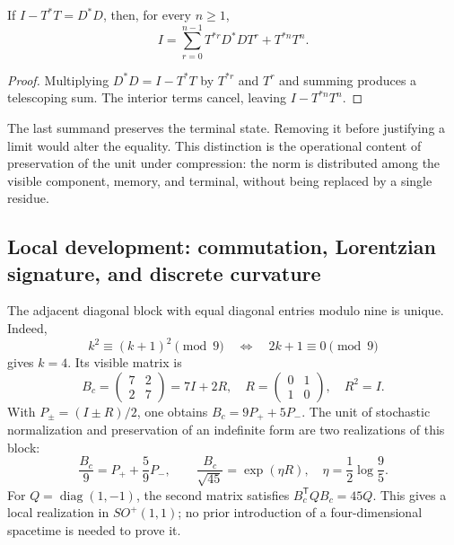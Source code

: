 \begin{proposition}
If \(I-T^*T=D^*D\), then, for every \(n\ge1\),
\begin{equation}
 I=\sum_{r=0}^{n-1}T^{*r}D^*DT^r+T^{*n}T^n.
 \label{eq:telescopia}
\end{equation}
\end{proposition}
\begin{proof}
Multiplying \(D^*D=I-T^*T\) by \(T^{*r}\) and \(T^r\) and summing produces a telescoping sum. The interior terms cancel, leaving \(I-T^{*n}T^n\).
\end{proof}

The last summand preserves the terminal state. Removing it before justifying a limit would alter the equality. This distinction is the operational content of preservation of the unit under compression: the norm is distributed among the visible component, memory, and terminal, without being replaced by a single residue.

\subsection{Local development: commutation, Lorentzian signature, and discrete curvature}
\label{iv:extension-curvatura-mixta}

The adjacent diagonal block with equal diagonal entries modulo nine is unique. Indeed,
\[
 k^2\equiv(k+1)^2\pmod9\quad\Longleftrightarrow\quad2k+1\equiv0\pmod9
\]
gives \(k=4\). Its visible matrix is
\[
 B_c=\begin{pmatrix}7&2\\2&7\end{pmatrix}=7I+2R,
 \quad R=\begin{pmatrix}0&1\\1&0\end{pmatrix},\quad R^2=I.
\]
With \(P_\pm=(I\pm R)/2\), one obtains \(B_c=9P_++5P_-\). The unit of stochastic normalization and preservation of an indefinite form are two realizations of this block:
\[
 \frac{B_c}{9}=P_++\frac59P_-,\qquad
 \frac{B_c}{\sqrt{45}}=\exp(\eta R),\quad\eta=\frac12\log\frac95.
\]
For \(Q=\operatorname{diag}(1,-1)\), the second matrix satisfies \(B_c^{\mathsf T}QB_c=45Q\). This gives a local realization in \(SO^+(1,1)\); no prior introduction of a four-dimensional spacetime is needed to prove it.

